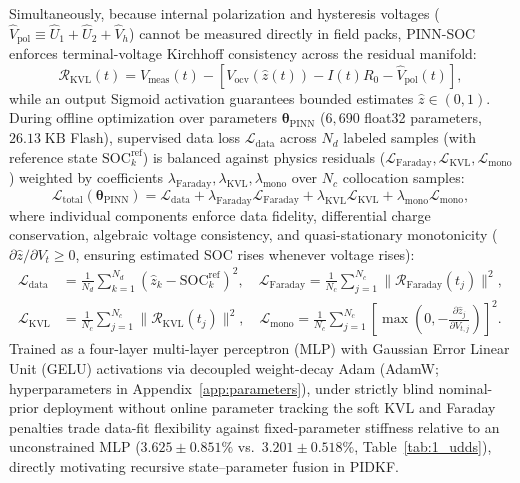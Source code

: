 \documentclass[11pt,a4paper]{article}
\begin{document}
Simultaneously, because internal polarization and hysteresis voltages ($\hat{V}_{\text{pol}} \equiv \hat{U}_1 + \hat{U}_2 + \hat{V}_h$) cannot be measured directly in field packs, PINN-SOC enforces terminal-voltage Kirchhoff consistency across the residual manifold:
\begin{equation}\label{eqn:res_kvl}
\mathcal{R}_{\text{KVL}}(t) = V_{\text{meas}}(t) - \left[ V_{\text{ocv}}(\hat{z}(t)) - I(t) R_0 - \hat{V}_{\text{pol}}(t) \right],
\end{equation}
while an output Sigmoid activation guarantees bounded estimates $\hat{z} \in (0, 1)$. During offline optimization over parameters $\boldsymbol{\theta}_{\text{PINN}}$ ($6,690$ float32 parameters, $26.13\;\mathrm{KB}$ Flash), supervised data loss $\mathcal{L}_{\text{data}}$ across $N_d$ labeled samples (with reference state $\text{SOC}_k^{\text{ref}}$) is balanced against physics residuals ($\mathcal{L}_{\text{Faraday}}, \mathcal{L}_{\text{KVL}}, \mathcal{L}_{\text{mono}}$) weighted by coefficients $\lambda_{\text{Faraday}}, \lambda_{\text{KVL}}, \lambda_{\text{mono}}$ over $N_c$ collocation samples:
\begin{equation}\label{eqn:pinn_loss}
\mathcal{L}_{\text{total}}(\boldsymbol{\theta}_{\text{PINN}}) = \mathcal{L}_{\text{data}} + \lambda_{\text{Faraday}} \mathcal{L}_{\text{Faraday}} + \lambda_{\text{KVL}} \mathcal{L}_{\text{KVL}} + \lambda_{\text{mono}} \mathcal{L}_{\text{mono}},
\end{equation}
where individual components enforce data fidelity, differential charge conservation, algebraic voltage consistency, and quasi-stationary monotonicity ($\partial \hat{z}/\partial V_t \ge 0$, ensuring estimated SOC rises whenever voltage rises):
\begin{align}
\mathcal{L}_{\text{data}} &= \frac{1}{N_d} \sum_{k=1}^{N_d} (\hat{z}_k - \text{SOC}_k^{\text{ref}})^2, \quad \mathcal{L}_{\text{Faraday}} = \frac{1}{N_c} \sum_{j=1}^{N_c} \|\mathcal{R}_{\text{Faraday}}(t_j)\|^2, \label{eqn:pinn_loss_data_faraday} \\
\mathcal{L}_{\text{KVL}} &= \frac{1}{N_c} \sum_{j=1}^{N_c} \|\mathcal{R}_{\text{KVL}}(t_j)\|^2, \quad \mathcal{L}_{\text{mono}} = \frac{1}{N_c}\sum_{j=1}^{N_c} \left[\max\left(0, -\frac{\partial \hat{z}_j}{\partial V_{t,j}}\right)\right]^2. \label{eqn:pinn_loss_kvl_mono}
\end{align}
Trained as a four-layer multi-layer perceptron (MLP) with Gaussian Error Linear Unit (GELU) activations via decoupled weight-decay Adam (AdamW; hyperparameters in Appendix~\ref{app:parameters}), under strictly blind nominal-prior deployment without online parameter tracking the soft KVL and Faraday penalties trade data-fit flexibility against fixed-parameter stiffness relative to an unconstrained MLP ($3.625\pm0.851\%$ vs.\ $3.201\pm0.518\%$, Table~\ref{tab:1_udds}), directly motivating recursive state--parameter fusion in PIDKF.
\end{document}
